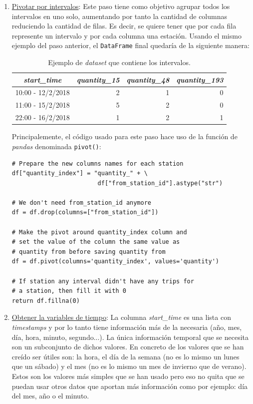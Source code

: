 \begin{enumerate}
    \item \underline{Pivotar por intervalos}: Este paso tiene como objetivo agrupar todos los intervalos en uno solo, aumentando por tanto la cantidad de columnas reduciendo la cantidad de filas. Es decir, se quiere tener que por cada fila represente un intervalo y por cada columna una estación. Usando el mismo ejemplo del paso anterior, el \small{\verb|DataFrame|} final quedaría de la siguiente manera:
    \begin{table}[H]
    \footnotesize
    \centering
    \begin{tabular}{c|rrr}
        \toprule
        \textit{start\_time} & \textit{quantity\_15} & \textit{quantity\_48} & \textit{quantity\_193}  \\
        \midrule
        10:00 - 12/2/2018 & 2 & 1 & 0 \\
        11:00 - 15/2/2018 & 5 & 2 & 0 \\
        22:00 - 16/2/2018 & 1 & 2 & 1 \\
        
        \bottomrule
    \end{tabular}
    \cprotect\caption{Ejemplo de \textit{dataset} que contiene los intervalos.}
    \label{tab:intervals_example}
    \end{table}
    
    Principalemente, el código usado para este paso hace uso de la función de \textit{pandas} denominada \small{\verb|pivot()|}:
    \begin{verbatim}
# Prepare the new columns names for each station
df["quantity_index"] = "quantity_" + \
                        df["from_station_id"].astype("str")

# We don't need from_station_id anymore
df = df.drop(columns=["from_station_id"])

# Make the pivot around quantity_index column and
# set the value of the column the same value as
# quantity from before saving quantity from
df = df.pivot(columns='quantity_index', values='quantity')

# If station any interval didn't have any trips for
# a station, then fill it with 0
return df.fillna(0)
    \end{verbatim}
    
    \item \underline{Obtener la variables de tiempo}: La columna \textit{start\_time} es una lista con \textit{timestamps} y por lo tanto tiene información más de la necesaria (año, mes, día, hora, minuto, segundo...). La única información temporal que se necesita son un subconjunto de dichos valores. En concreto de los valores que se han creído ser útiles son: la hora, el día de la semana (no es lo mismo un lunes que un sábado) y el mes (no es lo mismo un mes de invierno que de verano). Estos son los valores más simples que se han usado pero eso no quita que se puedan usar otros datos que aportan más información como por ejemplo: día del mes, año o el minuto. 
    \newline
    

\end{enumerate}
